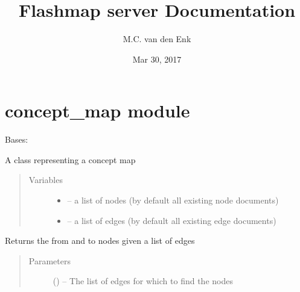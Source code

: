 \documentclass[letterpaper,10pt,english]{sphinxmanual}
\title{Flashmap server Documentation}
\date{Mar 30, 2017}
\author{M.C. van den Enk}
\begin{document}
\maketitle
\sphinxtableofcontents
{}\label{\detokenize{index::doc}}



\chapter{concept\_map module}
\label{\detokenize{concept_map:module-concept_map}}\label{\detokenize{concept_map:concept-map-module}}\label{\detokenize{concept_map::doc}}\label{\detokenize{concept_map:contents}}

\begin{fulllineitems}
\label{\detokenize{concept_map:concept_map.ConceptMap}}
Bases: 

A class representing a concept map
\begin{quote}\begin{description}
\item[{Variables}] \leavevmode\begin{itemize}
\item {} 
 -- a list of nodes (by default all existing node documents)

\item {} 
 -- a list of edges (by default all existing edge documents)

\end{itemize}

\end{description}\end{quote}

\begin{fulllineitems}
\label{\detokenize{concept_map:concept_map.ConceptMap.find_nodes}}
Returns the from and to nodes given a list of edges
\begin{quote}\begin{description}
\item[{Parameters}] \leavevmode
{} (\href{https://docs.python.org/2/library/functions.html\#list}{}\sphinxstyleliteralemphasis{)}\sphinxstyleliteralemphasis{}) -- The list of edges for which to find the nodes


\end{description}
\end{quote}
\end{fulllineitems}
\end{fulllineitems}
\end{document}
